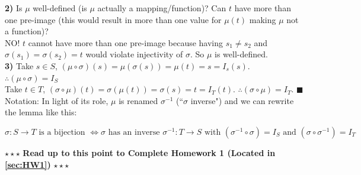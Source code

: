 \begin{lemma}
\noindent\textbf{2)} Is $\mu$ well-defined (is $\mu$ actually a mapping/function)? Can $t$ have more than one pre-image (this would result in more than one value for $\mu(t)$ making $\mu$ not a function)?\steezybreak\\
NO! $t$ cannot have more than one pre-image because having $s_1\neq s_2$ and $\sigma(s_1)=\sigma(s_2)=t$ would violate injectivity of $\sigma$. So $\mu$ is well-defined.\steezybreak\\

\noindent\textbf{3)} Take $s\in S$, $(\mu\circ \sigma)(s)=\mu(\sigma(s))=\mu(t)=s=I_s(s)$. $\therefore (\mu\circ \sigma)= I_S$\steezybreak\\

Take $t\in T$, $(\sigma\circ \mu)(t)= \sigma(\mu(t))=\sigma(s)=t=I_T(t)$. $\therefore (\sigma\circ \mu) = I_T$. $\blacksquare$ \steezybreak\\

\noindent Notation: In light of its role, $\mu$ is renamed $\sigma^{-1}$ (``$\sigma$ inverse") and we can rewrite the lemma like this:

\begin{equation}
    \sigma:S\rightarrow T \text{ is a bijection } \iff \sigma \text{ has an inverse } \sigma^{-1}: T\rightarrow S \text{ with } (\sigma^{-1}\circ \sigma)= I_S \text{ and } (\sigma \circ \sigma^{-1})=I_T\nonumber
\end{equation}
\end{lemma}\steezybreak
\begin{tcolorbox}
\begin{center}
    $\star\star\star$ \textbf{Read up to this point to Complete Homework 1 (Located in \ref{sec:HW1})} $\star\star\star$
\end{center}
\end{tcolorbox}
\steezybreak
